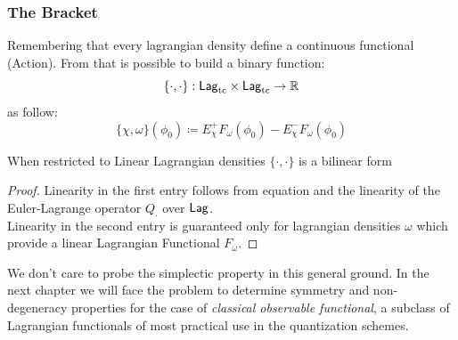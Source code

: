 \documentclass[Main]{subfiles}
\begin{document}
		\subsubsection{The Bracket}
		Remembering that every lagrangian density define a continuous functional (Action).
		From that is possible to build a binary function:
		\begin{displaymath}
			\{\cdot,\cdot\}:\mathsf{Lag}_{\textrm{tc}} \times \mathsf{Lag}_{\textrm{tc}} \rightarrow \mathbb{R} 	
		\end{displaymath}
		as follow:
		\begin{equation}\label{AbstractPeierlsBracket}
				\{\chi, \omega \}(\phi_0) \coloneqq E_\chi^+ F_\omega (\phi_0) - E_\chi^- F_\omega(\phi_0)
		\end{equation}

		\begin{proposition}[Bilinearity]
			When restricted to Linear Lagrangian densities $\{\cdot,\cdot\}$ is a bilinear form
		\end{proposition}
		\begin{proof}
			Linearity in the first entry follows from equation \cite{Perturbation} and the linearity of the Euler-Lagrange operator $Q_\cdot$ over $\mathsf{Lag}$.
			\\
			Linearity in the second entry is guaranteed only for lagrangian densities $\omega$ which provide a linear Lagrangian Functional $F_\omega$.
		\end{proof}
		We don't care to probe the simplectic property in this general ground. In the next chapter we will face the problem to determine  symmetry and non-degeneracy properties for the case of  \emph{classical observable functional}, a subclass of Lagrangian functionals of most practical use in the quantization schemes.
\end{document}
